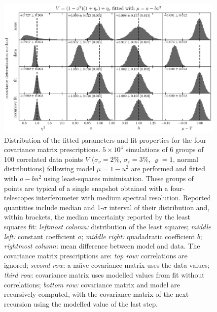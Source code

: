 \documentclass[twocolumn]{article}
\def\norm{_\tau}
\def\meas{_\nu}
\def\data{\ensuremath{{\scriptstyle V}}}
\def\mod{\ensuremath{\mu}}
\def\dev{\ensuremath{\sigma}}
\def\reldev{\ensuremath{\dev\norm}}
\def\absdev{\ensuremath{\dev\meas}}
\def\corr{\ensuremath{\varrho}}
\begin{document}
\begin{figure}
\centering
\includegraphics[width=\linewidth]{pdf/fit-quality.pdf}
\caption{Distribution of the fitted parameters and fit properties for the four covariance matrix prescriptions. $5\times10^4$ simulations of 6 groups of 100 correlated data points $\data$ ($\absdev = 2\%$, $\reldev = 3\%$, $\corr = 1$, normal distributions) following model $\mod = 1-u^2$ are performed and fitted with $a - bu^2$ using least-squares minimisation. These groups of points are typical of a single snapshot obtained with a four-telescopes interferometer with medium spectral resolution. Reported quantities include median and 1-$\sigma$ interval of their distribution and, within brackets, the median uncertainty reported by the least squares fit: \emph{leftmost column:} distribution of the least squares; \emph{middle left:} constant coefficient $a$; \emph{middle right:} quadadratic coefficient $b$; \emph{rightmost column:} mean difference between model and data. The covariance matrix prescriptions are: \emph{top row:} correlations are ignored; \emph{second row:} a na\"\i{}ve covariance matrix uses the data values; \emph{third row:} covariance matrix uses modelled values from fit without correlations; \emph{bottom row:} covariance matrix and model are recursively computed, with the covariance matrix of the next recursion using the modelled value of the last step.}
\end{figure}
\end{document}
